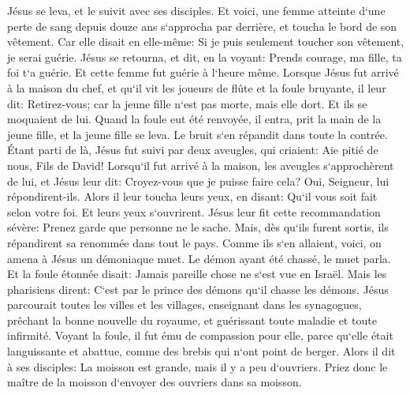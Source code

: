 \verse Jésus se leva, et le suivit avec ses disciples. 
\verse Et voici, une femme atteinte d`une perte de sang depuis douze ans s`approcha par derrière, et toucha le bord de son vêtement. 
\verse Car elle disait en elle-même: Si je puis seulement toucher son vêtement, je serai guérie. 
\verse Jésus se retourna, et dit, en la voyant: Prends courage, ma fille, ta foi t`a guérie. Et cette femme fut guérie à l`heure même. 
\verse Lorsque Jésus fut arrivé à la maison du chef, et qu`il vit les joueurs de flûte et la foule bruyante, 
\verse il leur dit: Retirez-vous; car la jeune fille n`est pas morte, mais elle dort. Et ils se moquaient de lui. 
\verse Quand la foule eut été renvoyée, il entra, prit la main de la jeune fille, et la jeune fille se leva. 
\verse Le bruit s`en répandit dans toute la contrée. 
\verse Étant parti de là, Jésus fut suivi par deux aveugles, qui criaient: Aie pitié de nous, Fils de David! 
\verse Lorsqu`il fut arrivé à la maison, les aveugles s`approchèrent de lui, et Jésus leur dit: Croyez-vous que je puisse faire cela? Oui, Seigneur, lui répondirent-ils. 
\verse Alors il leur toucha leurs yeux, en disant: Qu`il vous soit fait selon votre foi. 
\verse Et leurs yeux s`ouvrirent. Jésus leur fit cette recommandation sévère: Prenez garde que personne ne le sache. 
\verse Mais, dès qu`ils furent sortis, ils répandirent sa renommée dans tout le pays. 
\verse Comme ils s`en allaient, voici, on amena à Jésus un démoniaque muet. 
\verse Le démon ayant été chassé, le muet parla. Et la foule étonnée disait: Jamais pareille chose ne s`est vue en Israël. 
\verse Mais les pharisiens dirent: C`est par le prince des démons qu`il chasse les démons. 
\verse Jésus parcourait toutes les villes et les villages, enseignant dans les synagogues, prêchant la bonne nouvelle du royaume, et guérissant toute maladie et toute infirmité. 
\verse Voyant la foule, il fut ému de compassion pour elle, parce qu`elle était languissante et abattue, comme des brebis qui n`ont point de berger. 
\verse Alors il dit à ses disciples: La moisson est grande, mais il y a peu d`ouvriers. 
\verse Priez donc le maître de la moisson d`envoyer des ouvriers dans sa moisson. 

\chapter{}

